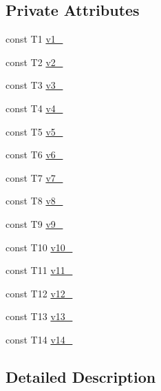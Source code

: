 \subsection*{\-Private \-Attributes}
\begin{DoxyCompactItemize}
\item 
const \-T1 \hyperlink{classtesting_1_1internal_1_1ValueArray14_aac1d0654cc6c1aceb4a5d0fa7a98042e}{v1\-\_\-}
\item 
const \-T2 \hyperlink{classtesting_1_1internal_1_1ValueArray14_a9f0a8ce6ce2fd27e980c4c51a7a7256a}{v2\-\_\-}
\item 
const \-T3 \hyperlink{classtesting_1_1internal_1_1ValueArray14_a4f8257321a2eab0456239174d6712d5e}{v3\-\_\-}
\item 
const \-T4 \hyperlink{classtesting_1_1internal_1_1ValueArray14_aac184059fee257381ccae81d8d112f85}{v4\-\_\-}
\item 
const \-T5 \hyperlink{classtesting_1_1internal_1_1ValueArray14_a1f3e0ada8419ed2e17cc61e6c0c54404}{v5\-\_\-}
\item 
const \-T6 \hyperlink{classtesting_1_1internal_1_1ValueArray14_a13d84d5824617bbc6fb1a6b3ee3cb745}{v6\-\_\-}
\item 
const \-T7 \hyperlink{classtesting_1_1internal_1_1ValueArray14_a4063f0b7a528133d018ee488ba44a9a3}{v7\-\_\-}
\item 
const \-T8 \hyperlink{classtesting_1_1internal_1_1ValueArray14_a596bc5260b2474271d1f6910ff6f665d}{v8\-\_\-}
\item 
const \-T9 \hyperlink{classtesting_1_1internal_1_1ValueArray14_a6356e16cf54a9dfac8525f20242af31e}{v9\-\_\-}
\item 
const \-T10 \hyperlink{classtesting_1_1internal_1_1ValueArray14_a147ca4457ea439b00a93087231ff77ef}{v10\-\_\-}
\item 
const \-T11 \hyperlink{classtesting_1_1internal_1_1ValueArray14_a12a4baf9ab57c7e9b5b4f1612e59e529}{v11\-\_\-}
\item 
const \-T12 \hyperlink{classtesting_1_1internal_1_1ValueArray14_a35ffe6d4d723857722ab319a235eddfc}{v12\-\_\-}
\item 
const \-T13 \hyperlink{classtesting_1_1internal_1_1ValueArray14_a8c6e803e306975fc3ed6717875688efa}{v13\-\_\-}
\item 
const \-T14 \hyperlink{classtesting_1_1internal_1_1ValueArray14_a812dbcac0513d6c5242ff4df1b8da6dd}{v14\-\_\-}
\end{DoxyCompactItemize}


\subsection{\-Detailed \-Description}
